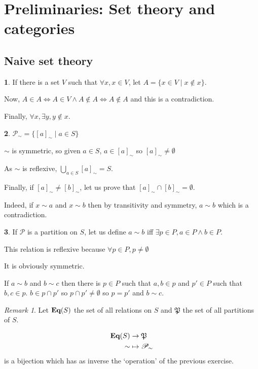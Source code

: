 \documentclass[11pt]{article}
\theoremstyle{definition}
\newtheorem{exo}{}[subsection]
\theoremstyle{remark}
\newtheorem*{rmq}{Remark}
\newcommand{\catname}[1]{{\normalfont\textbf{#1}}}
\begin{document}
\tableofcontents

\section{Preliminaries: Set theory and categories}

\subsection{Naive set theory}

\begin{exo}
	If there is a set $V$ such that $\forall x,x\in V$, let $A=\{x\in V\mid x\notin x\}$.

	Now, $A\in A\iff A\in V\land A\notin A\iff A\notin A$ and this is a contradiction.

	Finally, $\forall x,\exists y,y\notin x$.

\end{exo}

\begin{exo}
	$\mathcal P_\sim=\{[a]_\sim\mid a\in S\}$

	$\sim$ is symmetric, so given $a\in S$, $a\in[a]_\sim$ so $[a]_\sim\neq\emptyset$

	As $\sim$ is reflexive, $\bigcup_{a\in S}[a]_\sim=S$.

	Finally, if $[a]_\sim\neq[b]_\sim$, let us prove that $[a]_\sim\cap[b]_\sim=\emptyset$.

	Indeed, if $x\sim a$ and $x\sim b$ then by transitivity and symmetry, $a\sim b$ which is a contradiction.
\end{exo}

\begin{exo}
	If $\mathcal P$ is a partition on $S$, let us define $a\sim b$ iff $\exists p\in P,a\in P\land b\in P$.

	This relation is reflexive because $\forall p\in P,p\neq\emptyset$

	It is obviously symmetric.

	If $a\sim b$ and $b\sim c$ then there is $p\in P$ such that $a,b\in p$ and $p'\in P$ such that $b,c\in p$. $b\in p\cap p'$ so $p\cap p'\neq\emptyset$ so $p=p'$ and $b\sim c$.
\end{exo}

\begin{rmq}
	Let $\catname{Eq}(S)$ the set of all relations on $S$ and $\mathfrak P$ the set of all partitions of $S$.

	\begin{align*}\catname{Eq}(S)&\to\mathfrak P\\\sim&\mapsto\mathcal P_\sim\end{align*} is a bijection which has as inverse the `operation' of the previous exercise.
\end{rmq}
\end{document}
